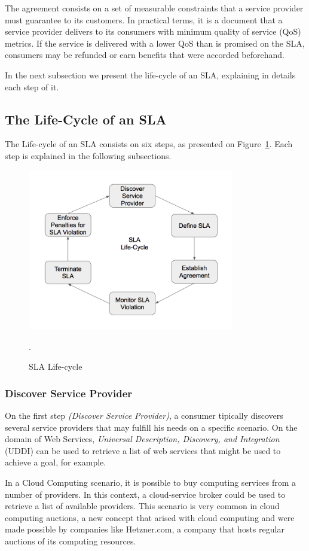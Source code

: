 The agreement consists on a set of measurable constraints that a service provider must guarantee to its customers.
In practical terms, it is a document that a service provider delivers to its consumers with minimum quality of service (QoS) metrics. 
If the service is delivered with a lower QoS than is promised on the SLA, consumers may be refunded or earn benefits that were accorded beforehand. 

In the next subsection we present the life-cycle of an SLA, explaining in details each step of it. 

\subsection{The Life-Cycle of an SLA}

The Life-cycle of an SLA consists on six steps, as presented on Figure~\ref{fig:sla-lifecycle}. Each step is explained in the following subsections. 

\begin{figure}[ht!]
\centering
\includegraphics[width=90mm]{Imagens/sla-lifecycle.png}
\caption{SLA Life-cycle \cite{wu2012service}}.\label{fig:sla-lifecycle}
\end{figure}

\subsubsection{Discover Service Provider}
On the first step \textit{(Discover Service Provider)}, a consumer tipically discovers several service providers that may fulfill his needs on a specific scenario. On the domain of Web Services, \textit{Universal Description, Discovery, and Integration} (UDDI) can be used to retrieve a list of web services that might be used to achieve a goal, for example. 

In a Cloud Computing scenario, it is possible to buy computing services from a number of providers. In this context, a cloud-service broker could be used to retrieve a list of available providers. This scenario is very common in cloud computing auctions\cite{7145493}, a new concept that arised with cloud computing and were made possible by companies like Hetzner.com, a company that hosts regular auctions of its computing resources.


